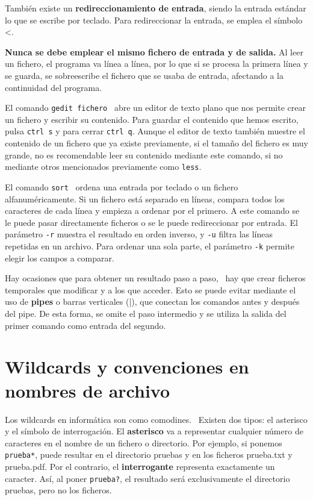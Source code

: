 También existe un \textbf{redireccionamiento de entrada}, siendo la entrada estándar lo que se escribe por teclado. Para redireccionar la entrada, se emplea el símbolo <.  \marginpar[\footnotesize <] \ 

\begin{table}[htbp]
\begin{mdframed}[backgroundcolor=red!10]
    \centering
    \textbf{Nunca se debe emplear el mismo fichero de entrada y de salida.} Al leer un fichero, el programa va línea a línea, por lo que si se procesa la primera línea y se guarda, se sobreescribe el fichero que se usaba de entrada, afectando a la continuidad del programa.
    \end{mdframed}
\end{table}

El comando \texttt{gedit fichero}  \ abre un editor de texto plano que nos permite crear un fichero y escribir su contenido. Para guardar el contenido que hemos escrito, pulsa \texttt{ctrl s} y para cerrar \texttt{ctrl q}. Aunque el editor de texto también muestre el contenido de un fichero que ya existe previamente, si el tamaño del fichero es muy grande, no es recomendable leer su contenido mediante este comando, si no mediante otros mencionados previamente como \texttt{less}.

El comando \texttt{sort}  \ ordena una entrada por teclado o un fichero alfanuméricamente. Si un fichero está separado en líneas, compara todos los caracteres de cada línea y empieza a ordenar por el primero. A este comando se le puede pasar directamente ficheros o se le puede redireccionar por entrada. El parámetro \texttt{-r} muestra el resultado en orden inverso, y \texttt{-u} filtra las líneas repetidas en un archivo. Para ordenar una sola parte, el parámetro \texttt{-k} permite elegir los campos a comparar.

Hay ocasiones que para obtener un resultado paso a paso,  \marginpar[\footnotesize |] \ hay que crear ficheros temporales que modificar y a los que acceder. Esto se puede evitar mediante el uso de \textbf{pipes} o barras verticales (|), que conectan los comandos antes y después del pipe. De esta forma, se omite el paso intermedio y se utiliza la salida del primer comando como entrada del segundo. 

\section{Wildcards y convenciones en nombres de archivo}
Los wildcards en informática son como comodines. \marginpar[\footnotesize * \\ ?] \ Existen dos tipos: el asterisco y el símbolo de interrogación. El \textbf{asterisco} va a representar cualquier número de caracteres en el nombre de un fichero o directorio. Por ejemplo, si ponemos \texttt{prueba*}, puede resultar en el directorio pruebas y en los ficheros prueba.txt y prueba.pdf. Por el contrario, el \textbf{interrogante} representa exactamente un caracter. Así, al poner \texttt{prueba?}, el resultado será exclusivamente el directorio pruebas, pero no los ficheros.

